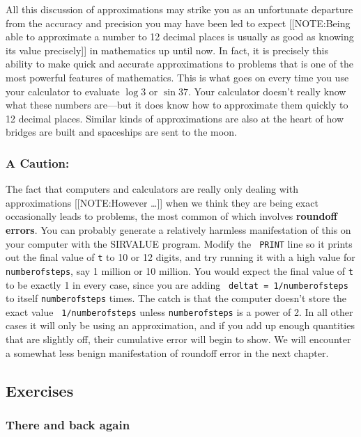 All this discussion of approximations may strike you as an unfortunate
 departure from the accuracy and precision you may have been led to
 expect
[[NOTE:Being able to approximate a number to 12 decimal places is
 usually as good as knowing its value precisely]]
in mathematics up until now.  In fact, it is precisely this ability to
 make quick and accurate approximations to problems that is one of the
 most powerful features of mathematics.  This is what goes on every
 time you use your calculator to evaluate $\log 3$ or $\sin 37$.  Your
 calculator doesn't really know what these numbers are---but it does
 know how to approximate them quickly to 12 decimal places.  Similar
 kinds of approximations are also at the heart of how bridges are
 built and spaceships are sent to the moon.

\subsubsection{A Caution:}
The fact that computers and calculators are really
 only dealing with approximations
[[NOTE:However \ldots   \mbox{}]]
when we think they are being exact occasionally leads to problems, the
 most common of which involves {\bf roundoff errors}. You can probably generate a relatively harmless manifestation
 of this on your computer with the SIRVALUE program.  Modify the {\tt
 PRINT} line so it prints out the final value of {\tt t} to 10 or 12
 digits, and try running it with a high value for {\tt numberofsteps},
 say 1 million or 10 million.  You would expect the final value of
 {\tt t} to be exactly 1 in every case, since you are adding {\tt
 deltat = 1/numberofsteps} to itself {\tt numberofsteps} times.  The
 catch is that the computer doesn't store the exact value {\tt
 1/numberofsteps} unless {\tt numberofsteps} is a power of 2.  In all
 other cases it will only be using an approximation, and if you add up
 enough quantities that are slightly off, their cumulative error will
 begin to show.  We will encounter a somewhat less benign
 manifestation of roundoff error in the next chapter.


\subsection{Exercises}
\label{subsec:exercises}


\subsubsection{There and back again}




